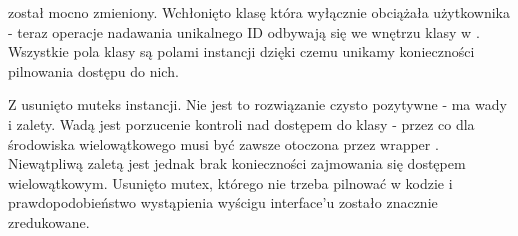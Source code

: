  został mocno zmieniony. Wchłonięto klasę  która wyłącznie obciążała użytkownika - teraz operacje nadawania unikalnego ID odbywają się we wnętrzu klasy w . Wszystkie pola klasy są polami instancji dzięki czemu unikamy konieczności pilnowania dostępu do nich.

Z  usunięto muteks instancji. Nie jest to rozwiązanie czysto pozytywne - ma wady i zalety. Wadą jest porzucenie kontroli nad dostępem do klasy - przez co dla środowiska wielowątkowego musi być zawsze otoczona przez wrapper . Niewątpliwą zaletą jest jednak brak konieczności zajmowania się dostępem wielowątkowym. Usunięto mutex, którego nie trzeba pilnować w kodzie i prawdopodobieństwo wystąpienia wyścigu interface'u zostało znacznie zredukowane.
